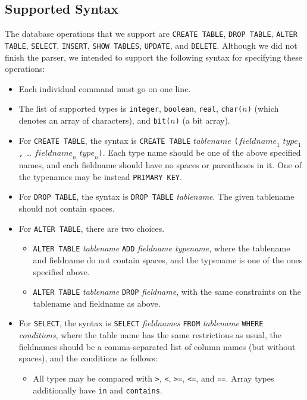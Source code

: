 \documentclass[10pt]{article}
\begin{document}
\begin{multicols}{2}
\subsection{Supported Syntax}
\label{simplifying_parsing_assumptions}
The database operations that we support are \texttt{CREATE TABLE}, \texttt{DROP TABLE}, \texttt{ALTER TABLE}, \texttt{SELECT}, \texttt{INSERT}, \texttt{SHOW TABLES}, \texttt{UPDATE}, and \texttt{DELETE}. Although we did not finish the parser, we intended to support the following syntax for specifying these operations:
\begin{itemize}
	\item Each individual command must go on one line.
	\item The list of supported types is \verb+integer+, \verb+boolean+, \verb+real+, \verb+char(+$n$\verb+)+ (which denotes an array of characters), and \verb+bit(+$n$\verb+)+ (a bit array).
	\item For \texttt{CREATE TABLE}, the syntax is \texttt{CREATE TABLE} $\mathit{tablename}$ \verb+(+$\mathit{fieldname}_1$ $\mathit{type}_1$\verb+,+ \dots{} $\mathit{fieldname}_n$ $\mathit{type}_n$\verb+)+. Each type name should be one of the above specified names, and each fieldname should have no spaces or parentheses in it. One of the typenames may be instead \texttt{PRIMARY KEY}.
	\item For \texttt{DROP TABLE}, the syntax is \verb+DROP TABLE+ \textit{tablename}. The given tablename should not contain spaces.
	\item For \texttt{ALTER TABLE}, there are two choices.
	\begin{itemize}
		\item \texttt{ALTER TABLE} \textit{tablename} \texttt{ADD} \textit{fieldname typename}, where the tablename and fieldname do not contain spaces, and the typename is one of the ones specified above.
		\item \texttt{ALTER TABLE} \textit{tablename} \texttt{DROP} \textit{fieldname}, with the same constraints on the tablename and fieldname as above.
	\end{itemize}
	\item For \texttt{SELECT}, the syntax is \texttt{SELECT} \textit{fieldnames} \texttt{FROM} \textit{tablename} \texttt{WHERE} \textit{conditions}, where the table name has the same restrictions as usual, the fieldnames should be a comma-separated list of column names (but without spaces), and the conditions as follows:
	\begin{itemize}
		\item All types may be compared with \verb+>+, \verb+<+, \verb+>=+, \verb+<=+, and \verb+==+. Array types additionally have \verb+in+ and \verb+contains+.

\end{itemize}
\end{itemize}
\end{multicols}
\end{document}
